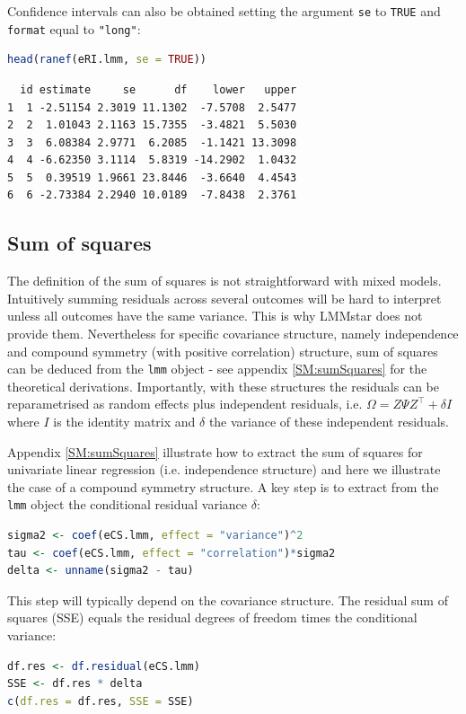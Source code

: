\documentclass[12pt]{article}
\newcommand\Warning[1][3ex]{%
\renewcommand\stacktype{L}%
\scaleto{\stackon[1.3pt]{\color{red}$\triangle$}{\tiny\bfseries !}}{#1}%
\xspace
}
\newcommand\trans[1]{{#1}^\intercal}%
\begin{document}
Confidence intervals can also be obtained setting the argument \texttt{se} to
\texttt{TRUE} and \texttt{format} equal to \texttt{"long"}:
\begin{lstlisting}[language=r,numbers=none]
head(ranef(eRI.lmm, se = TRUE))
\end{lstlisting}

\label{}
\begin{verbatim}
  id estimate     se      df    lower   upper
1  1 -2.51154 2.3019 11.1302  -7.5708  2.5477
2  2  1.01043 2.1163 15.7355  -3.4821  5.5030
3  3  6.08384 2.9771  6.2085  -1.1421 13.3098
4  4 -6.62350 3.1114  5.8319 -14.2902  1.0432
5  5  0.39519 1.9661 23.8446  -3.6640  4.4543
6  6 -2.73384 2.2940 10.0189  -7.8438  2.3761
\end{verbatim}


\clearpage
\subsection{Sum of squares}
\label{sec:org3932f9f}

\Warning The definition of the sum of squares is not straightforward with mixed
models. Intuitively summing residuals across several outcomes will be
hard to interpret unless all outcomes have the same variance. This is
why LMMstar does not provide them. Nevertheless for specific
covariance structure, namely independence and compound symmetry (with
positive correlation) structure, sum of squares can be deduced from
the \texttt{lmm} object - see appendix \ref{SM:sumSquares} for the theoretical
derivations. Importantly, with these structures the residuals can be
reparametrised as random effects plus independent residuals,
i.e. \(\Omega = Z \Psi \trans{Z} + \delta I\) where \(I\) is the
identity matrix and \(\delta\) the variance of these independent
residuals.

\bigskip

Appendix \ref{SM:sumSquares} illustrate how to extract the sum of squares
for univariate linear regression (i.e. independence structure) and
here we illustrate the case of a compound symmetry structure.  A key
step is to extract from the \texttt{lmm} object the conditional residual variance
\(\delta\):
\begin{lstlisting}[language=r,numbers=none]
sigma2 <- coef(eCS.lmm, effect = "variance")^2
tau <- coef(eCS.lmm, effect = "correlation")*sigma2
delta <- unname(sigma2 - tau)
\end{lstlisting}

This step will typically depend on the covariance structure. The
residual sum of squares (SSE) equals the residual degrees of freedom
times the conditional variance:
\begin{lstlisting}[language=r,numbers=none]
df.res <- df.residual(eCS.lmm)
SSE <- df.res * delta
c(df.res = df.res, SSE = SSE)
\end{lstlisting}
\end{document}
